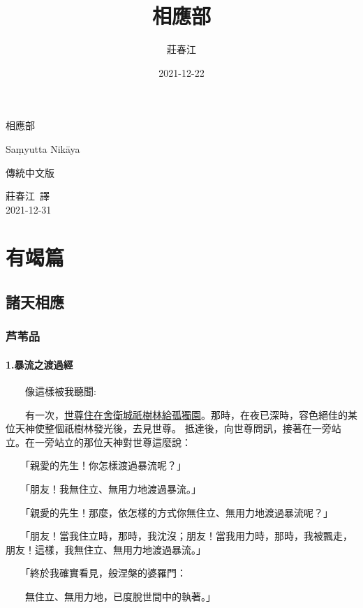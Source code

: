 \documentclass[12pt,oneside]{book}
\title{相應部}
\author{莊春江}
\date{2021-12-22}
\newcommand{\HRule}{\rule{\linewidth}{0.5mm}}
\begin{document}
\begin{titlepage}
\begin{center}
\null \vspace{2cm}
{\fontsize{130}{140}\selectfont \jfontSansTC 相應部}

{\fontsize{45}{55}\selectfont \fontSansD Saṃyutta Nikāya}

{\Huge 傳統中文版}
\\ \vspace{0.5em}

\vfill

{\Large 莊春江\ 譯}
\\ \vspace{0.5em}
{\Large 2021-12-31}

\end{center}
\end{titlepage}

\part{有竭篇}

\chapter{諸天相應}
\section{芦苇品}

\subsection{1.暴流之渡過經}
　　像這樣被我聽聞:

　　有一次，\underline{世尊住在舍衛城祇樹林給孤獨園}。那時，在夜已深時，容色絕佳的某位天神使整個祇樹林發光後，去見世尊。
抵達後，向世尊問訊，接著在一旁站立。在一旁站立的那位天神對世尊這麼說：

　　「親愛的先生！你怎樣渡過暴流呢？」

　　「朋友！我無住立、無用力地渡過暴流。」

　　「親愛的先生！那麼，依怎樣的方式你無住立、無用力地渡過暴流呢？」

　　「朋友！當我住立時，那時，我沈沒；朋友！當我用力時，那時，我被飄走，朋友！這樣，我無住立、無用力地渡過暴流。」

　　「終於我確實看見，般涅槃的婆羅門：

　　無住立、無用力地，已度脫世間中的執著。」
\end{document}
